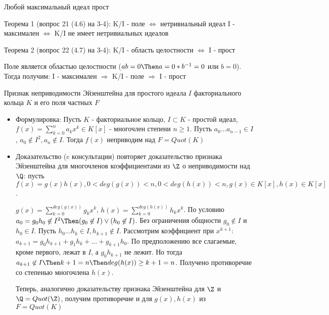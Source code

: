 \begin{problem} [27]
	Любой максимальный идеал прост
\end{problem}
\begin{solution}
	Теорема 1 (вопрос 21 (4.6) на 3-4): K/I - поле $\Leftrightarrow$ нетривиальный идеал I - максимален $\Leftrightarrow$ K/I не имеет нетривиальных идеалов
	
	Теорема 2 (вопрос 22 (4.7) на 3-4): K/I - область целостности $\Leftrightarrow$ I - прост
	
	Поле является областью целостности ($ab=0 \Then a = 0*b^{-1}= 0$ или $b = 0$). Тогда получим: I - максимален $\Rightarrow$ K/I - поле $\Rightarrow$ I - прост
\end{solution}

\begin{problem} [28]
	Признак неприводимости Эйзенштейна для простого идеала $I$ факториального кольца $K$ и его поля частных $F$
\end{problem}
\begin{solution}
	\begin{itemize}
	\item Формулировка: Пусть $K$ - факториальное кольцо, $I \subset K$ - простой идеал, $f(x) = \sum\limits_{k=0}^{n} a_kx^k  \in K[x]$ - многочлен степени $n \geq 1$. Пусть $a_0...a_{n-1} \in I$, $a_0 \not\in I^2, a_n \not\in I$. Тогда $f(x)$ неприводим над $F = Quot(K)$
	
	\item Доказательство (c консультации) повторяет доказательство признака Эйзенштейна для многочленов коэффициентами из $\Z$ о неприводимости над $\Q$: пусть $f(x) = g(x)h(x), 0 < deg(g(x)) < n, 0 < deg(h(x)) < n, g(x) \in K[x], h(x) \in K[x]$.
	
	$g(x) = \sum\limits_{k=0}^{deg(g(x))} g_kx^k$, $h(x) = \sum\limits_{k=0}^{deg(h(x))} h_kx^k$. По условию $a_0 = g_0h_0 \not\in I^2 \Then (g_0 \not\in I) \vee (h_0 \not\in I)$. Без ограничения общности $g_0 \not\in I$ и $h_0 \in I$. Пусть $h_0...h_k \in I, h_{k+1} \not\in I$. Рассмотрим коэффициент при $x^{k+1}$: $a_{k+1} = g_0h_{k+1} + g_1h_k + ... + g_{k+1}h_0$. По предположению все слагаемые, кроме первого, лежат в $I$, а $g_0h_{k+1}$ не лежит. Но тогда $a_{k+1} \not\in I \Then k+1 = n \Then deg(h(x)) \geq k + 1 = n$. Получено противоречие со степенью многочлена $h(x)$.
	
	Теперь, аналогично доказательству признака Эйзенштейна для $\Z$ и $\Q = Quot(\Z)$, получим противоречие и для $g(x), h(x)$ из $F = Quot(K)$
	\end{itemize}
\end{solution}

